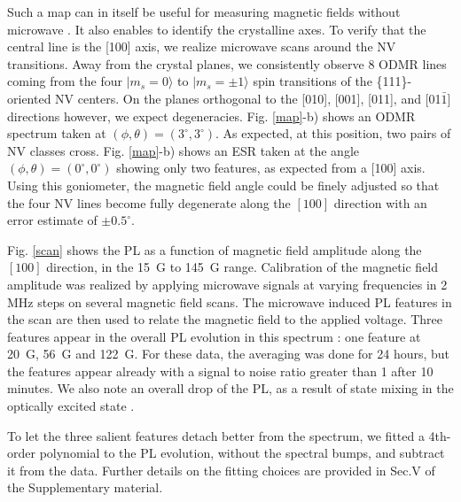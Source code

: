 \documentclass[9pt,twocolumn,twoside]{revtex4-1}
\begin{document}
Such a map can in itself be useful for measuring magnetic fields without microwave \cite{akhmedzhanov_magnetometry_2019}. 
It also enables to identify the crystalline axes. 
To verify that the central line is the [100] axis, we realize microwave scans around the NV transitions. Away from the crystal planes, we consistently observe 8 ODMR lines coming from the four $| m_s=0\rangle$ to $| m_s=\pm1\rangle$ spin transitions of the \{111\}-oriented NV centers. On the planes orthogonal to the [010], [001], [011], and [01$\bar 1$] directions however, we expect degeneracies. 
Fig. \ref{map}-b) shows an ODMR spectrum taken at $(\phi, \theta)=(3^\circ,3^\circ)$. As expected, at this position, two pairs of NV classes cross.
Fig. \ref{map}-b) shows an ESR taken at the angle  $(\phi, \theta)=(0^\circ,0^\circ)$ showing only two features, as expected from a [100] axis. Using this goniometer, the magnetic field angle could be finely adjusted so that the four NV lines become fully degenerate along the $[100]$ direction with an error estimate of $\pm 0.5^\circ$.

Fig. \ref{scan} shows the PL as a function of magnetic field amplitude along the $[ 100 ]$ direction, in the 15~G to 145~G range. 
Calibration of the magnetic field amplitude was realized by applying microwave signals at varying frequencies in 2 MHz steps on several magnetic field scans. The microwave induced PL features in the scan are then used to relate the magnetic field to the applied voltage. 
Three features appear in the overall PL evolution in this spectrum : one feature at 20~G,  56~G and 122~G. 
For these data, the averaging was done for 24 hours, but the features appear already with a signal to noise ratio greater than 1 after 10 minutes.  
We also note an overall drop of the PL, as a result of state mixing in the optically excited state \cite{DOHERTY20131}. 

To let the three salient features detach better from the spectrum, we fitted a 4th-order polynomial to the PL evolution, without the spectral bumps, and subtract it from the data. Further details on the fitting choices are provided in Sec.V of the Supplementary material.
\end{document}
